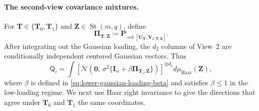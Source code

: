 \documentclass[11pt]{article}
\begin{document}
\paragraph{The second-view covariance mixtures.}
For $\bm T\in\{\bm T_0,\bm T_1\}$ and
$\bm Z\in\operatorname{St}(m,q)$, define
\[
  \bm\Pi_{\bm T,\bm Z}
  \coloneqq
  \bm P_{\operatorname{col}
  [\bm U_{\bm T},\bm V_{2,\bm T,\bm Z}]}.
\]
After integrating out the Gaussian loading, the $d_2$ columns of View~2
are conditionally independent centered Gaussian vectors.  Thus
\begin{equation}
  \mathsf Q_i
  =
  \int
  \left[
    \mathcal N\left(
      \bm0,\,
      \sigma^2\{\bm I_n+\beta\bm\Pi_{\bm T_i,\bm Z}\}
    \right)
  \right]^{\otimes d_2}
  d\mu_{\mathrm{Haar}}(\bm Z),
\label{eq:lower-hidden-mixture-law}
\end{equation}
where $\beta$ is defined in
\cref{eq:lower-gaussian-loading-beta} and satisfies $\beta\le1$ in the
low-loading regime.  We next use Haar right invariance to give the directions
that agree under $\bm T_0$ and $\bm T_1$ the same coordinates.
\end{document}
